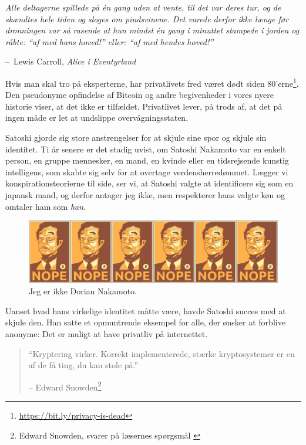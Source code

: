 \documentclass[paper=6in:9in,pagesize=pdftex,
               headinclude=on,footinclude=on,12pt]{scrbook}
\makeatletter
\newenvironment{chapquote}[2][4em]{\setlength{\@tempdima}{#1}%
   \def\chapquote@author{#2}%
   \parshape 1 \@tempdima \dimexpr\textwidth-2\@tempdima\relax%
   \itshape}{\par\normalfont\hfill--\ \chapquote@author\hspace*{\@tempdima}\par\bigskip}
\makeatother
\begin{document}
\begin{chapquote}{Lewis Carroll, \textit{Alice i Eventyrland}} Alle deltagerne spillede på \'en gang uden at vente, til det var deres tur, og de skændtes hele tiden og sloges om pindsvinene. Det varede derfor ikke længe før dronningen var så rasende at hun mindst \'en gang i minuttet stampede i jorden og råbte: \enquote{af med hans hoved!} eller: \enquote{af med hendes hoved!} \end{chapquote}

Hvis man skal tro på eksperterne, har privatlivets fred været dødt siden 80'erne\footnote{\url{https://bit.ly/privacy-is-dead}}. Den pseudonyme opfindelse af Bitcoin og andre begivenheder i vores nyere historie viser, at det ikke er tilfældet. Privatlivet lever, på trods af, at det på ingen måde er let at undslippe overvågningsstaten.

Satoshi gjorde sig store anstrengelser for at skjule sine spor og skjule sin identitet. Ti år senere er det stadig uvist, om Satoshi Nakamoto var en enkelt person, en gruppe mennesker, en mand, en kvinde eller en tidsrejsende kunstig intelligens, som skabte sig selv for at overtage verdensherredømmet. Lægger vi konspirationsteorierne til side, ser vi, at Satoshi valgte at identificere sig som en japansk mand, og derfor antager jeg ikke, men respekterer hans valgte køn og omtaler ham som \textit{han}.\begin{figure}
  \includegraphics{assets/images/nope.png}
  \caption{Jeg er ikke Dorian Nakamoto.}
  \label{fig:nope}
\end{figure}

Uanset hvad hans virkelige identitet måtte være, havde Satoshi succes med at skjule den. Han satte et opmuntrende eksempel for alle, der ønsker at forblive anonyme: Det er muligt at have privatliv på internettet.\begin{quotation}\begin{samepage} \enquote{Kryptering virker. Korrekt implementerede, stærke kryptosystemer er en af de få ting, du kan stole på.} \begin{flushright} -- Edward Snowden\footnote{Edward Snowden, svarer på læsernes spørgsmål \cite{snowden}}
\end{flushright}\end{samepage}\end{quotation}
\end{document}

